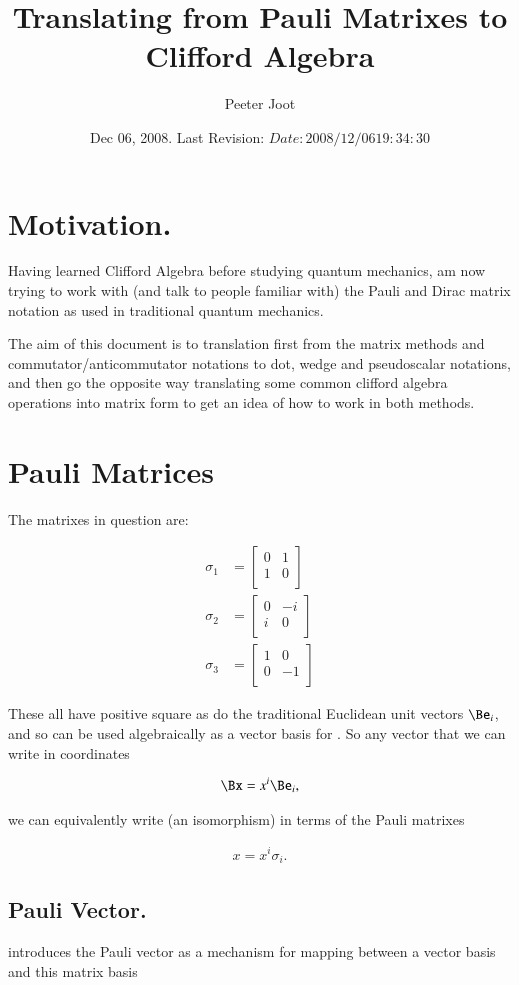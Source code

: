 \documentclass{article}
\title{Translating from Pauli Matrixes to Clifford Algebra}
\author{Peeter Joot}
\date{ Dec 06, 2008.  Last Revision: $Date: 2008/12/06 19:34:30 $ }
\newcommand{\PauliX}[0]{
\begin{bmatrix}
0 & 1 \\
1 & 0 \\
\end{bmatrix}
}
\newcommand{\PauliY}[0]{
\begin{bmatrix}
0 & -i \\
i & 0 \\
\end{bmatrix}
}
\newcommand{\PauliZ}[0]{
\begin{bmatrix}
1 & 0 \\
0 & -1 \\
\end{bmatrix}
}
\begin{document}
\maketitle{}


\section{ Motivation. }

Having learned Clifford Algebra before studying quantum mechanics, am now trying to work with (and talk to people familiar with) the Pauli and Dirac matrix notation as used in
traditional quantum mechanics.

The aim of this document is to translation first from the matrix methods and commutator/anticommutator notations to dot, wedge and pseudoscalar notations, and then
go the opposite way translating some common clifford algebra operations into matrix form to get an idea of how to work in both methods.

\section{ Pauli Matrices }

The matrixes in question are:

\begin{align}
\sigma_1 &= \PauliX \\
\sigma_2 &= \PauliY \\
\sigma_3 &= \PauliZ
\end{align}

These all have positive square as do the traditional Euclidean unit vectors $\Be_i$, and so can be used algebraically as a vector basis for .  So any vector that we
can write in coordinates

\begin{align*}
\Bx = x^i \Be_i,
\end{align*}

we can equivalently write (an isomorphism) in terms of the Pauli matrixes

\begin{align}\label{eqn:vectorInPauliBasis}
x = x^i \sigma_i.
\end{align}

\subsection{ Pauli Vector. }
\cite{wikipauli} introduces the Pauli vector as a mechanism for mapping between a vector basis and this matrix basis
\end{document}
